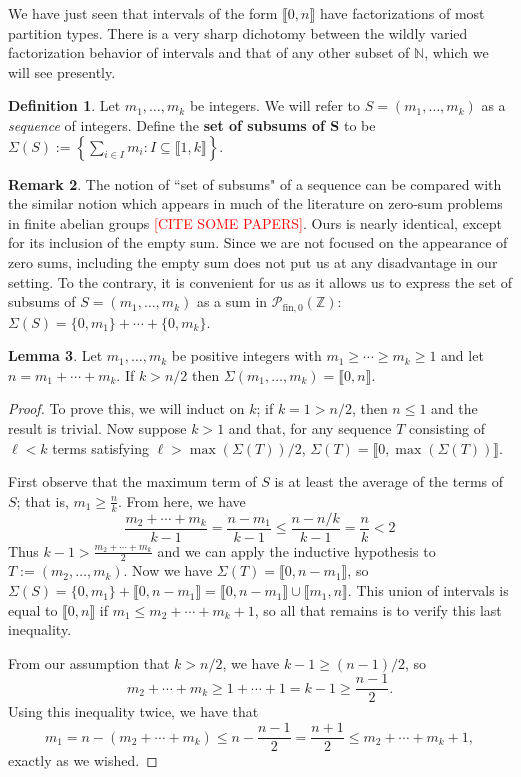 \documentclass{report}
\newcommand{\NN}{\mathbb{N}}
\renewcommand{\P}{\mathcal{P}}
\newcommand{\ZZ}{\mathbb{Z}}
\newcommand{\llb}{\llbracket}
\newcommand{\rrb}{\rrbracket}
\newcommand{\fon}{{\textrm{fin}, 0}}
\renewcommand{\:}{\text{:}}
\theoremstyle{definition}
\newtheorem{defn}{Definition}[section]
\newtheorem{lemma}[defn]{Lemma}
\newtheorem{rk}[defn]{Remark}
\begin{document}
We have just seen that intervals of the form $\llb 0,n \rrb$ have factorizations of most partition types.
There is a very sharp dichotomy between the wildly varied factorization behavior of intervals and that of any other subset of $\NN$, which we will see presently.  

\begin{defn}
Let $m_1,\dots, m_k$ be integers.
We will refer to $S = (m_1,\dots, m_k)$ as a \textit{sequence} of integers.
Define the \textbf{set of subsums of S} to be $\Sigma(S) := \left\{ \sum_{i\in I} m_i : I\subseteq \llb 1,k \rrb \right\}$.
\end{defn}

\begin{rk}
The notion of ``set of subsums" of a sequence can be compared with the similar notion which appears in much of the literature on zero-sum problems in finite abelian groups \textcolor{red}{[CITE SOME PAPERS]}.  
Ours is nearly identical, except for its inclusion of the empty sum.
Since we are not focused on the appearance of zero sums, including the empty sum does not put us at any disadvantage in our setting.
To the contrary, it is convenient for us as it allows us to express the set of subsums of $S = (m_1,\dots, m_k)$ as a sum in $\P_\fon(\ZZ)$: $\Sigma(S)  = \{0,m_1\} + \cdots +\{0,m_k\}$.
\end{rk}

\begin{lemma} \label{lem:long-partitions}
Let $m_1,\dots, m_k$ be positive integers with $m_1\ge \cdots \ge m_k \ge 1$ and let $n = m_1 + \cdots + m_k$.
If $k> n/2$ then $\Sigma(m_1,\dots, m_k) = \llb 0,n \rrb$.
\end{lemma}

\begin{proof}
To prove this, we will induct on $k$; if $k=1 > n/2$, then $n \le 1$ and the result is trivial.
Now suppose $k > 1$ and that, for any sequence $T$ consisting of $\ell < k$ terms satisfying $\ell > \max(\Sigma(T))/2$, $\Sigma(T) = \llb 0, \max(\Sigma(T)) \rrb$.

First observe that the maximum term of $S$ is at least the average of the terms of $S$; that is, $m_1 \ge \frac{n}{k}$.
From here, we have
\[ \frac{m_2+\cdots + m_k}{k-1} = \frac{n-m_1}{k-1} \le \frac{n-n/k}{k-1} = \frac{n}{k} < 2 \]
Thus $k - 1 > \frac{m_2+\cdots+m_k}{2}$ and we can apply the inductive hypothesis to $T := (m_2,\dots, m_k)$.
Now we have $\Sigma(T) = \llb 0, n-m_1 \rrb$, so $\Sigma(S) = \{0,m_1\} + \llb 0,n-m_1 \rrb = \llb 0,n-m_1 \rrb \cup \llb m_1,n \rrb$.
This union of intervals is equal to $\llb 0,n \rrb$ if $m_1 \le m_2 + \cdots + m_k +1$, so all that remains is to verify this last inequality.

From our assumption that $k > n/2$, we have $k-1 \ge (n-1)/2$, so 
\[m_2 + \cdots + m_k \ge 1 +\cdots + 1 = k-1 \ge \frac{n-1}{2}.\]
Using this inequality twice, we have that
\[m_1 = n - (m_2 + \cdots + m_k) \le n - \frac{n-1}{2} = \frac{n+1}{2} \le m_2 + \cdots + m_k + 1,\]
exactly as we wished.
\end{proof}
\end{document}
